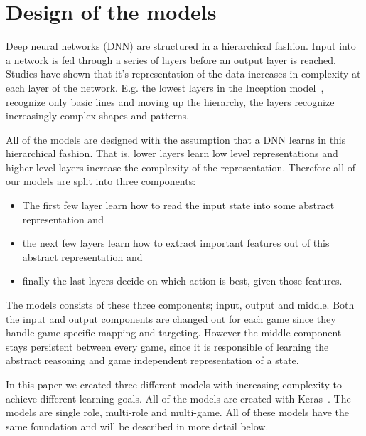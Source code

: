 \documentclass[twocolumn, letterpaper, 10 pt, conference]{ieeeconf}  %
\begin{document}
    

\section{Design of the models}
    Deep neural networks (DNN) are structured in a hierarchical fashion. Input into a network is fed through a series of layers before an output layer is reached. Studies have shown that it's representation of the data increases in complexity at each layer of the network. E.g. the lowest layers in the Inception model~\cite{szegedy2015going}, recognize only basic lines and moving up the hierarchy, the layers recognize increasingly complex shapes and patterns.
    
    All of the models are designed with the assumption that a DNN learns in this hierarchical fashion. That is, lower layers learn low level representations and higher level layers increase the complexity of the representation. Therefore all of our models are split into three components:
    \begin{itemize}
        \item The first few layer learn how to read the input state into some abstract representation and 
        \item the next few layers learn how to extract important features out of this abstract representation and 
        \item finally the last layers decide on which action is best, given those features.
    \end{itemize}
    
    The models consists of these three components; input, output and middle. Both the input and output components are changed out for each game since they handle game specific mapping and targeting. However the middle component stays persistent between every game, since it is responsible of learning the abstract reasoning and game independent representation of a state.

    In this paper we created three different models with increasing complexity to achieve different learning goals. All of the models are created with Keras~\cite{chollet2015keras}. The models are single role, multi-role and multi-game. All of these models have the same foundation and will be described in more detail below.
\end{document}
